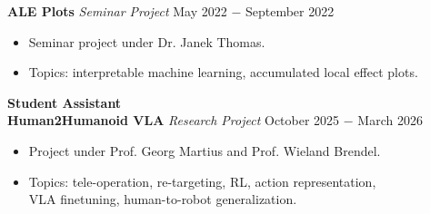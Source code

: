 \documentclass{article}
\begin{document}
\noindent \textbf{ALE Plots} \textit{Seminar Project} \href{https://github.com/RobinU434/AccumulatedLocalEffectPlots}{\faGithubSquare} \hfill  May 2022 $-$ September 2022
\begin{itemize}[noitemsep,nolistsep,leftmargin=*]
    \item Seminar project under Dr. Janek Thomas.
    \item Topics: interpretable machine learning, accumulated local effect plots.\\
\end{itemize}




\textbf{Student Assistant} \\

\noindent \textbf{Human2Humanoid VLA} \textit{Research Project} \hfill October 2025 $-$ March 2026
\begin{itemize}[noitemsep,nolistsep,leftmargin=*]
    \item Project under Prof. Georg Martius and Prof. Wieland Brendel.
    \item Topics: tele-operation, re-targeting, RL, action representation, \\
    VLA finetuning, human-to-robot generalization.\\
\end{itemize}
\end{document}
